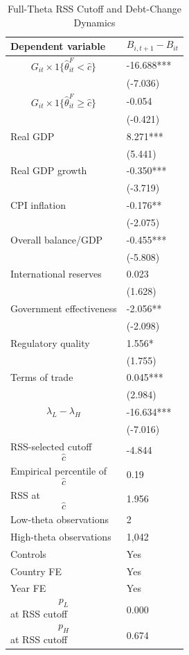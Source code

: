 \begin{table}[H]\centering
\begin{threeparttable}
\caption{Full-Theta RSS Cutoff and Debt-Change Dynamics}
\label{tab:deltaB_rss_cutoff_fulltheta}
\scriptsize
\begin{tabularx}{\textwidth}{lY}
\toprule
Dependent variable & $$B_{i,t+1}-B_{it}$$ \\
\midrule
$$G_{it}\times 1\{\widehat{\theta}^{F}_{it}<\widehat{c}\}$$ & -16.688*** \\
 & (-7.036) \\
$$G_{it}\times 1\{\widehat{\theta}^{F}_{it}\geq\widehat{c}\}$$ & -0.054 \\
 & (-0.421) \\
Real GDP & 8.271*** \\
 & (5.441) \\
Real GDP growth & -0.350*** \\
 & (-3.719) \\
CPI inflation & -0.176** \\
 & (-2.075) \\
Overall balance/GDP & -0.455*** \\
 & (-5.808) \\
International reserves & 0.023 \\
 & (1.628) \\
Government effectiveness & -2.056** \\
 & (-2.098) \\
Regulatory quality & 1.556* \\
 & (1.755) \\
Terms of trade & 0.045*** \\
 & (2.984) \\
$$\lambda_L-\lambda_H$$ & -16.634*** \\
 & (-7.016) \\
\midrule
RSS-selected cutoff $$\widehat{c}$$ & -4.844 \\
Empirical percentile of $$\widehat{c}$$ & 0.19 \\
RSS at $$\widehat{c}$$ & 1.956 \\
Low-theta observations & 2 \\
High-theta observations & 1,042 \\
Controls & Yes \\
Country FE & Yes \\
Year FE & Yes \\
$$p_L$$ at RSS cutoff & 0.000 \\
$$p_H$$ at RSS cutoff & 0.674 \\

\end{tabularx}
\end{threeparttable}
\end{table}
